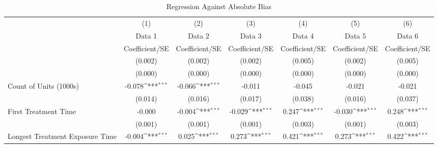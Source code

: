\begin{table}[htbp]\centering
\def\sym#1{\ifmmode^{#1}\else\(^{#1}\)\fi}
\caption{Regression Against Absolute Bias}
\begin{tabular}{l*{6}{c}}
\hline\hline
                    &\multicolumn{1}{c}{(1)}&\multicolumn{1}{c}{(2)}&\multicolumn{1}{c}{(3)}&\multicolumn{1}{c}{(4)}&\multicolumn{1}{c}{(5)}&\multicolumn{1}{c}{(6)}\\
                    &\multicolumn{1}{c}{Data 1}&\multicolumn{1}{c}{Data 2}&\multicolumn{1}{c}{Data 3}&\multicolumn{1}{c}{Data 4}&\multicolumn{1}{c}{Data 5}&\multicolumn{1}{c}{Data 6}\\
                    &Coefficient/SE         &Coefficient/SE         &Coefficient/SE         &Coefficient/SE         &Coefficient/SE         &Coefficient/SE         \\
\hline
                    &     (0.002)         &     (0.002)         &     (0.002)         &     (0.005)         &     (0.002)         &     (0.005)         \\
                    &     (0.000)         &     (0.000)         &     (0.000)         &     (0.000)         &     (0.000)         &     (0.000)         \\
Count of Units (1000s)&      -0.078\sym{***}&      -0.066\sym{***}&      -0.011         &      -0.045         &      -0.021         &      -0.021         \\
                    &     (0.014)         &     (0.016)         &     (0.017)         &     (0.038)         &     (0.016)         &     (0.037)         \\
First Treatment Time&      -0.000         &      -0.004\sym{***}&      -0.029\sym{***}&       0.247\sym{***}&      -0.030\sym{***}&       0.248\sym{***}\\
                    &     (0.001)         &     (0.001)         &     (0.001)         &     (0.003)         &     (0.001)         &     (0.003)         \\
Longest Treatment Exposure Time&      -0.004\sym{***}&       0.025\sym{***}&       0.273\sym{***}&       0.421\sym{***}&       0.273\sym{***}&       0.422\sym{***}\\

\end{tabular}
\end{table}
